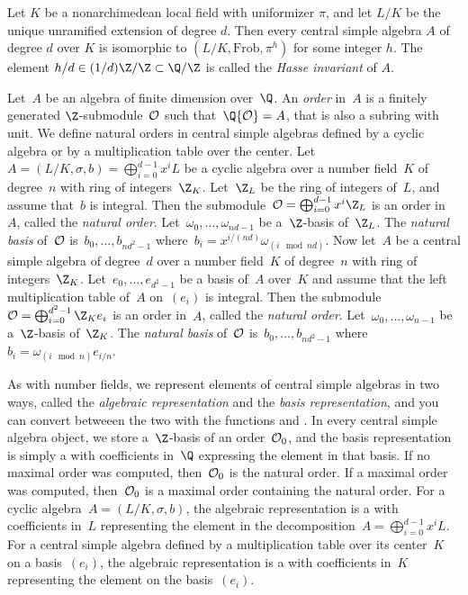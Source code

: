 \par Let $K$ be a nonarchimedean local field with uniformizer $\pi$, and let
$L/K$ be the unique unramified extension of degree $d$. Then every central
simple algebra $A$ of degree $d$ over $K$ is isomorphic to
$(L/K,\text{Frob},\pi^h)$ for some integer $h$. The element $h/d\in
(1/d)\Z/\Z\subset\Q/\Z$ is called the \emph{Hasse invariant} of $A$.

\par Let~$A$ be an algebra of finite dimension over~$\Q$. An \emph{order}
in~$A$ is a finitely generated $\Z$-submodule~${\cal O}$ such that~$\Q{\cal
O} = A$, that is also a subring with unit. We define natural orders in
central simple algebras defined by a cyclic algebra or by a multiplication
table over the center. Let~$A = (L/K,\sigma,b) = \bigoplus_{i=0}^{d-1}x^iL$
be a cyclic algebra over a number field~$K$ of degree~$n$ with ring of
integers~$\Z_K$. Let~$\Z_L$ be the ring of integers of~$L$, and assume
that~$b$ is integral. Then the submodule~${\cal O} =
\bigoplus_{i=0}^{d-1}x^i\Z_L$ is an order in~$A$, called the \emph{natural
order}. Let~$\omega_0,\dots,\omega_{nd-1}$ be a~$\Z$-basis of~$\Z_L$. The
\emph{natural basis} of~${\cal O}$ is~$b_0,\dots,b_{nd^2-1}$ where~$b_i =
x^{i/(nd)}\omega_{(i \mod nd)}$. Now let~$A$ be a central simple algebra of
degree~$d$ over a number field~$K$ of degree~$n$ with ring of
integers~$\Z_K$. Let~$e_0,\dots,e_{d^2-1}$ be a basis of~$A$ over~$K$ and
assume that the left multiplication table of~$A$ on~$(e_i)$ is integral. Then
the submodule~${\cal O} = \bigoplus_{i=0}^{d^2-1}\Z_K e_i$ is an order
in~$A$, called the \emph{natural order}. Let~$\omega_0,\dots,\omega_{n-1}$ be
a~$\Z$-basis of~$\Z_K$. The \emph{natural basis} of~${\cal O}$
is~$b_0,\dots,b_{nd^2-1}$ where~$b_i = \omega_{(i \mod n)}e_{i/n}$.

\par As with number fields, we represent elements of central simple algebras
in two ways, called the \emph{algebraic representation} and the \emph{basis
representation}, and you can convert betweeen the two with the functions
 and . In every central simple algebra
object, we store a~$\Z$-basis of an order~${\cal O}_0$, and the basis
representation is simply a  with coefficients in~$\Q$ expressing the
element in that basis. If no maximal order was computed, then~${\cal O}_0$ is
the natural order. If a maximal order was computed, then~${\cal O}_0$ is a
maximal order containing the natural order. For a cyclic algebra~$A =
(L/K,\sigma,b)$, the algebraic representation is a  with coefficients
in~$L$ representing the element in the decomposition~$A =
\bigoplus_{i=0}^{d-1}x^iL$. For a central simple algebra defined by a
multiplication table over its center~$K$ on a basis~$(e_i)$, the algebraic
representation is a  with coefficients in~$K$ representing the element
on the basis~$(e_i)$.

